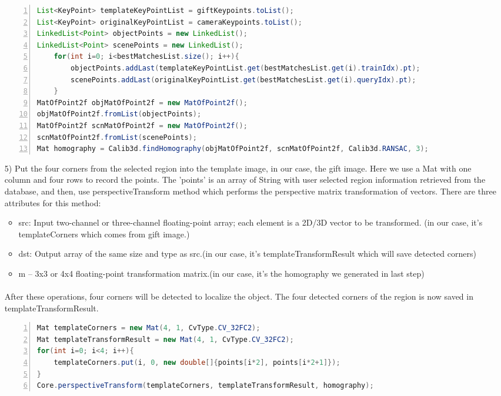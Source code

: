 \begin{enumerate}
\begin{lstlisting}[language={java},
        numbers=left,basicstyle=\footnotesize\ttfamily,breaklines=true,xleftmargin=.05\textwidth, xrightmargin=.05\textwidth] 
List<KeyPoint> templateKeyPointList = giftKeypoints.toList();
List<KeyPoint> originalKeyPointList = cameraKeypoints.toList();
LinkedList<Point> objectPoints = new LinkedList();
LinkedList<Point> scenePoints = new LinkedList();
    for(int i=0; i<bestMatchesList.size(); i++){
        objectPoints.addLast(templateKeyPointList.get(bestMatchesList.get(i).trainIdx).pt);
        scenePoints.addLast(originalKeyPointList.get(bestMatchesList.get(i).queryIdx).pt);
    }
MatOfPoint2f objMatOfPoint2f = new MatOfPoint2f();
objMatOfPoint2f.fromList(objectPoints);
MatOfPoint2f scnMatOfPoint2f = new MatOfPoint2f();
scnMatOfPoint2f.fromList(scenePoints);
Mat homography = Calib3d.findHomography(objMatOfPoint2f, scnMatOfPoint2f, Calib3d.RANSAC, 3);
\end{lstlisting} 
\item[5)] Put the four corners from the selected region into the template image, in our case, the gift image. Here we use a {\ttfamily Mat} with one column and four rows to record the points. The {\ttfamily 'points'} is an array of String with user selected region information retrieved from the database, and then, use perspectiveTransform method which performs the perspective matrix transformation of vectors. There are three attributes for this method: 
\begin{itemize}
\item src: Input two-channel or three-channel floating-point array; each element is a 2D/3D vector to be transformed. (in our case, it's templateCorners which comes from gift image.)
\item dst: Output array of the same size and type as src.(in our case, it's templateTransformResult which will save detected corners)
\item m – 3x3 or 4x4 floating-point transformation matrix.(in our case, it's the homography we generated in last step)
\end{itemize}
\paragraph{} After these operations, four corners will be detected to localize the object. The four detected corners of the region is now saved in templateTransformResult.
\begin{lstlisting}[language={java},
        numbers=left,basicstyle=\footnotesize\ttfamily,breaklines=true,xleftmargin=.05\textwidth, xrightmargin=.05\textwidth]
Mat templateCorners = new Mat(4, 1, CvType.CV_32FC2);
Mat templateTransformResult = new Mat(4, 1, CvType.CV_32FC2);
for(int i=0; i<4; i++){
    templateCorners.put(i, 0, new double[]{points[i*2], points[i*2+1]});
}
Core.perspectiveTransform(templateCorners, templateTransformResult, homography);
\end{lstlisting} 
\end{enumerate}
